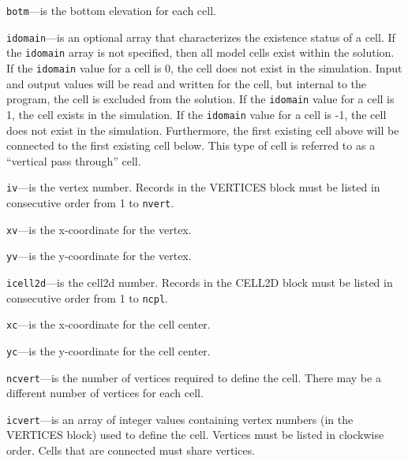 \item \texttt{botm}---is the bottom elevation for each cell.

\item \texttt{idomain}---is an optional array that characterizes the existence status of a cell.  If the \texttt{idomain} array is not specified, then all model cells exist within the solution.  If the \texttt{idomain} value for a cell is 0, the cell does not exist in the simulation.  Input and output values will be read and written for the cell, but internal to the program, the cell is excluded from the solution.  If the \texttt{idomain} value for a cell is 1, the cell exists in the simulation.  If the \texttt{idomain} value for a cell is -1, the cell does not exist in the simulation.  Furthermore, the first existing cell above will be connected to the first existing cell below.  This type of cell is referred to as a ``vertical pass through'' cell.

\item \texttt{iv}---is the vertex number.  Records in the VERTICES block must be listed in consecutive order from 1 to \texttt{nvert}.

\item \texttt{xv}---is the x-coordinate for the vertex.

\item \texttt{yv}---is the y-coordinate for the vertex.

\item \texttt{icell2d}---is the cell2d number.  Records in the CELL2D block must be listed in consecutive order from 1 to \texttt{ncpl}.

\item \texttt{xc}---is the x-coordinate for the cell center.

\item \texttt{yc}---is the y-coordinate for the cell center.

\item \texttt{ncvert}---is the number of vertices required to define the cell.  There may be a different number of vertices for each cell.

\item \texttt{icvert}---is an array of integer values containing vertex numbers (in the VERTICES block) used to define the cell.  Vertices must be listed in clockwise order.  Cells that are connected must share vertices.


